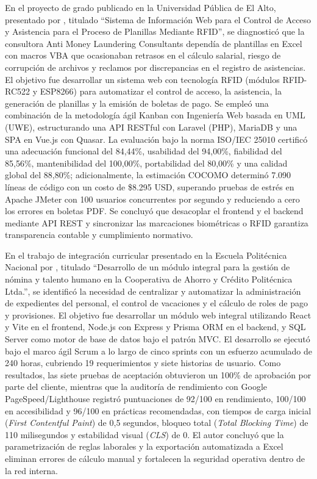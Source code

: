 En el proyecto de grado publicado en la Universidad Pública de El Alto, presentado por \textcite{zeballos2022sistema}, 
titulado ``Sistema de Información Web para el Control de Acceso y Asistencia para el Proceso de Planillas Mediante RFID'', 
se diagnosticó que la consultora Anti Money Laundering Consultants dependía de plantillas en Excel con macros VBA que ocasionaban 
retrasos en el cálculo salarial, riesgo de corrupción de archivos y reclamos por discrepancias en el registro de asistencias. 
El objetivo fue desarrollar un sistema web con tecnología RFID (módulos RFID-RC522 y ESP8266) para automatizar el control de acceso, 
la asistencia, la generación de planillas y la emisión de boletas de pago. Se empleó una combinación de la metodología ágil Kanban con Ingeniería Web basada en UML (UWE), 
estructurando una API RESTful con Laravel (PHP), MariaDB y una SPA en Vue.js con Quasar. La evaluación bajo la norma ISO/IEC 25010 certificó una adecuación funcional del 84,44\%, 
usabilidad del 94,00\%, fiabilidad del 85,56\%, mantenibilidad del 100,00\%, portabilidad del 80,00\% y una calidad global del 88,80\%; adicionalmente, 
la estimación COCOMO determinó 7.090 líneas de código con un costo de \$8.295 USD, superando pruebas de estrés en Apache JMeter con 100 usuarios concurrentes por segundo y 
reduciendo a cero los errores en boletas PDF. Se concluyó que desacoplar el frontend y el backend mediante API REST y sincronizar las marcaciones biométricas o 
RFID garantiza transparencia contable y cumplimiento normativo.

En el trabajo de integración curricular presentado en la Escuela Politécnica Nacional por \textcite{masapanta2025desarrollo}, 
titulado ``Desarrollo de un módulo integral para la gestión de nómina y talento humano en la Cooperativa de Ahorro y 
Crédito Politécnica Ltda.'', se identificó la necesidad de centralizar y automatizar la administración de expedientes del personal, 
el control de vacaciones y el cálculo de roles de pago y provisiones. El objetivo fue desarrollar un módulo web integral utilizando React 
y Vite en el frontend, Node.js con Express y Prisma ORM en el backend, y SQL Server como motor de base de datos bajo el patrón MVC. 
El desarrollo se ejecutó bajo el marco ágil Scrum a lo largo de cinco sprints con un esfuerzo acumulado de 240 horas, 
cubriendo 19 requerimientos y siete historias de usuario. Como resultados, las siete pruebas de aceptación obtuvieron un 100\% de aprobación por parte del cliente, 
mientras que la auditoría de rendimiento con Google PageSpeed/Lighthouse registró puntuaciones de 92/100 en rendimiento, 
100/100 en accesibilidad y 96/100 en prácticas recomendadas, con tiempos de carga inicial (\textit{First Contentful Paint}) 
de 0,5 segundos, bloqueo total (\textit{Total Blocking Time}) de 110 milisegundos y estabilidad visual (\textit{CLS}) de 0. 
El autor concluyó que la parametrización de reglas laborales y la exportación automatizada a Excel eliminan errores de cálculo manual 
y fortalecen la seguridad operativa dentro de la red interna.

